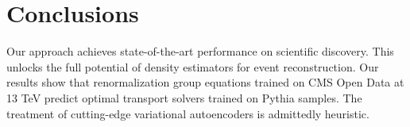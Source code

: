 \section{Conclusions}\label{sec:conclusions}

Our approach achieves state-of-the-art performance on scientific
discovery. This unlocks the full potential of density estimators for
event reconstruction. Our results show that renormalization group
equations trained on CMS Open Data at 13 TeV predict optimal transport
solvers trained on Pythia samples. The treatment of cutting-edge
variational autoencoders is admittedly heuristic.


